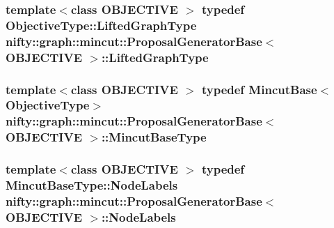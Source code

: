 \subsubsection[{Lifted\+Graph\+Type}]{\setlength{\rightskip}{0pt plus 5cm}template$<$class O\+B\+J\+E\+C\+T\+I\+V\+E $>$ typedef Objective\+Type\+::\+Lifted\+Graph\+Type {\bf nifty\+::graph\+::mincut\+::\+Proposal\+Generator\+Base}$<$ O\+B\+J\+E\+C\+T\+I\+V\+E $>$\+::{\bf Lifted\+Graph\+Type}}\label{classnifty_1_1graph_1_1mincut_1_1ProposalGeneratorBase_a0d24cbda65bb608f0b74e1316f0317a2}
\hypertarget{classnifty_1_1graph_1_1mincut_1_1ProposalGeneratorBase_a679c596a0ac3515d58b4ebd6cc643858}{}
\subsubsection[{Mincut\+Base\+Type}]{\setlength{\rightskip}{0pt plus 5cm}template$<$class O\+B\+J\+E\+C\+T\+I\+V\+E $>$ typedef {\bf Mincut\+Base}$<${\bf Objective\+Type}$>$ {\bf nifty\+::graph\+::mincut\+::\+Proposal\+Generator\+Base}$<$ O\+B\+J\+E\+C\+T\+I\+V\+E $>$\+::{\bf Mincut\+Base\+Type}}\label{classnifty_1_1graph_1_1mincut_1_1ProposalGeneratorBase_a679c596a0ac3515d58b4ebd6cc643858}
\hypertarget{classnifty_1_1graph_1_1mincut_1_1ProposalGeneratorBase_aa0c91c4d0f598763fdd2ae46ebd06437}{}
\subsubsection[{Node\+Labels}]{\setlength{\rightskip}{0pt plus 5cm}template$<$class O\+B\+J\+E\+C\+T\+I\+V\+E $>$ typedef {\bf Mincut\+Base\+Type\+::\+Node\+Labels} {\bf nifty\+::graph\+::mincut\+::\+Proposal\+Generator\+Base}$<$ O\+B\+J\+E\+C\+T\+I\+V\+E $>$\+::{\bf Node\+Labels}}\label{classnifty_1_1graph_1_1mincut_1_1ProposalGeneratorBase_aa0c91c4d0f598763fdd2ae46ebd06437}
\hypertarget{classnifty_1_1graph_1_1mincut_1_1ProposalGeneratorBase_ae58cbf5728a4180f1727b5df81c127cf}{}
